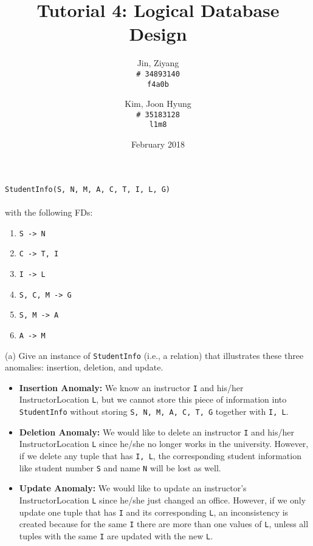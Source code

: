 \documentclass{article}
\title{Tutorial 4: Logical Database Design}
\author{
	Jin, Ziyang\\
	\texttt{\# 34893140}\\
	\texttt{f4a0b}
	\and
	Kim, Joon Hyung\\
	\texttt{\# 35183128}\\
	\texttt{l1m8}
}
\date{February 2018}
\begin{document}
	\maketitle
	\texttt{StudentInfo(S, N, M, A, C, T, I, L, G)}\\
	\\
	with the following FDs:
	\begin{enumerate}
		\item \texttt{S -> N}
		\item \texttt{C -> T, I}
		\item \texttt{I -> L}
		\item \texttt{S, C, M -> G}
		\item \texttt{S, M -> A}
		\item \texttt{A -> M}
	\end{enumerate}
	
\noindent (a) Give an instance of \texttt{StudentInfo} (i.e., a relation) that illustrates these three anomalies: insertion, deletion, and update.\\
\begin{itemize}
	\item \textbf{Insertion Anomaly:} We know an instructor \texttt{I} and his/her InstructorLocation \texttt{L}, but we cannot store this piece of information into \texttt{StudentInfo} without storing \texttt{S, N, M, A, C, T, G} together with \texttt{I, L}.
	\item \textbf{Deletion Anomaly:} We would like to delete an instructor \texttt{I} and his/her InstructorLocation \texttt{L} since he/she no longer works in the university. However, if we delete any tuple that has \texttt{I, L}, the corresponding student information like student number \texttt{S} and name \texttt{N} will be lost as well. 
	\item \textbf{Update Anomaly:} We would like to update an instructor's InstructorLocation \texttt{L} since he/she just changed an office. However, if we only update one tuple that has \texttt{I} and its corresponding \texttt{L}, an inconsistency is created because for the same \texttt{I} there are more than one values of \texttt{L}, unless all tuples with the same \texttt{I} are updated with the new \texttt{L}.
\end{itemize}
\end{document}
